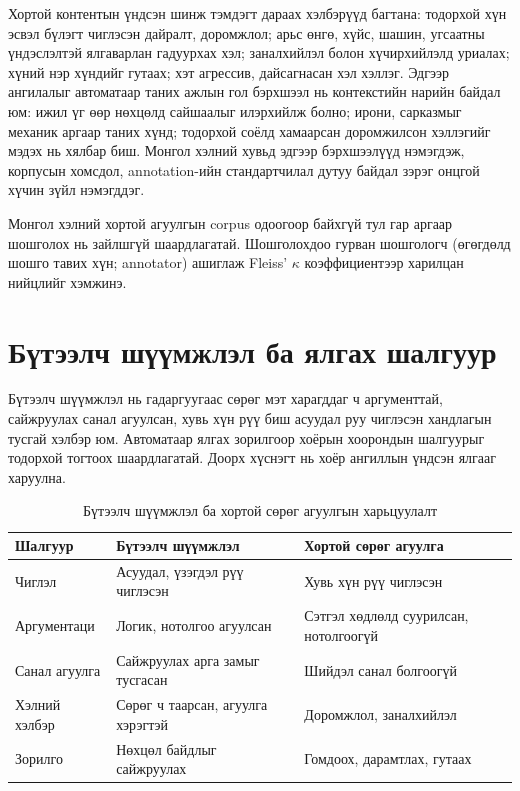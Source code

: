 Хортой контентын үндсэн шинж тэмдэгт дараах хэлбэрүүд багтана: тодорхой хүн
эсвэл бүлэгт чиглэсэн дайралт, доромжлол; арьс өнгө, хүйс, шашин, угсаатны
үндэслэлтэй ялгаварлан гадуурхах хэл; заналхийлэл болон хүчирхийлэлд уриалах;
хүний нэр хүндийг гутаах; хэт агрессив, дайсагнасан хэл хэллэг. Эдгээр
ангилалыг автоматаар таних ажлын гол бэрхшээл нь контекстийн нарийн байдал
юм: ижил үг өөр нөхцөлд сайшаалыг илэрхийлж болно; ирони, сарказмыг механик
аргаар таних хүнд; тодорхой соёлд хамаарсан доромжилсон хэллэгийг мэдэх нь
хялбар биш. Монгол хэлний хувьд эдгээр бэрхшээлүүд нэмэгдэж, корпусын
хомсдол, annotation-ийн стандартчилал дутуу байдал зэрэг онцгой хүчин зүйл
нэмэгддэг.

Монгол хэлний хортой агуулгын corpus одоогоор байхгүй тул гар аргаар шошголох
нь зайлшгүй шаардлагатай. Шошголохдоо гурван шошгологч (өгөгдөлд шошго тавих хүн; annotator)
ашиглаж Fleiss' $\kappa$ коэффициентээр харилцан нийцлийг хэмжинэ.

\section{Бүтээлч шүүмжлэл ба ялгах шалгуур}

Бүтээлч шүүмжлэл нь гадаргуугаас сөрөг мэт харагддаг ч
аргументтай, сайжруулах санал агуулсан, хувь хүн рүү биш асуудал руу чиглэсэн
хандлагын тусгай хэлбэр юм. Автоматаар ялгах зорилгоор хоёрын хоорондын
шалгуурыг тодорхой тогтоох шаардлагатай. Доорх хүснэгт нь хоёр ангиллын
үндсэн ялгааг харуулна.

\begin{table}[ht]
  \centering
  \small
  \caption{Бүтээлч шүүмжлэл ба хортой сөрөг агуулгын харьцуулалт}
  \label{tab:constructive-vs-toxic}
  \begin{tabular}{@{}lp{4.6cm}p{4.6cm}@{}}
    \toprule
    \textbf{Шалгуур} & \textbf{Бүтээлч шүүмжлэл} & \textbf{Хортой сөрөг агуулга} \\
    \midrule
    Чиглэл        & Асуудал, үзэгдэл рүү чиглэсэн      & Хувь хүн рүү чиглэсэн \\[2pt]
    Аргументаци   & Логик, нотолгоо агуулсан            & Сэтгэл хөдлөлд суурилсан, нотолгоогүй \\[2pt]
    Санал агуулга & Сайжруулах арга замыг тусгасан      & Шийдэл санал болгоогүй \\[2pt]
    Хэлний хэлбэр & Сөрөг ч таарсан, агуулга хэрэгтэй  & Доромжлол, заналхийлэл \\[2pt]
    Зорилго       & Нөхцөл байдлыг сайжруулах           & Гомдоох, дарамтлах, гутаах \\
    \bottomrule
  \end{tabular}
\end{table}

